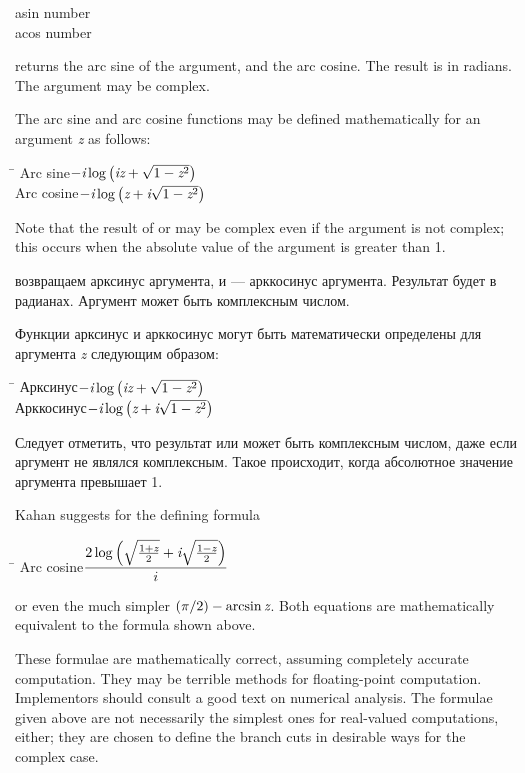 \begin{defun}[Function]
asin number \\
acos number

 returns the arc sine of the argument, and  the arc cosine.
The result is in radians.  The argument may be complex.

The arc sine and arc cosine functions may be defined mathematically for
an argument \emph{z} as follows:
\begin{tabbing}
\hskip 10pc\=\kill
Arc sine\>$ -\emph{i} \log \left(\emph{i}\emph{z} + \sqrt{1-\emph{z}^2}\right) $ \\[2pt]
Arc cosine\>$ -\emph{i} \log \left(\emph{z} + \emph{i}\sqrt{1-\emph{z}^2}\right) $
\end{tabbing}
Note that the result of  or  may be
complex even if the argument is not complex; this occurs
when the absolute value of the argument is greater than 1.

 возвращаем арксинус аргумента, и  --- арккосинус аргумента.
Результат будет в радианах. Аргумент может быть комплексным числом.

Функции арксинус и арккосинус могут быть математически определены для аргумента
\emph{z} следующим образом:
\begin{tabbing}
\hskip 10pc\=\kill
Арксинус\>$ -\emph{i} \log \left(\emph{i}\emph{z} + \sqrt{1-\emph{z}^2}\right) $ \\[2pt]
Арккосинус\>$ -\emph{i} \log \left(\emph{z} + \emph{i}\sqrt{1-\emph{z}^2}\right) $
\end{tabbing}
Следует отметить, что результат  или  может быть комплексным
числом, даже если аргумент не являлся комплексным. Такое происходит, когда
абсолютное значение аргумента превышает 1.

\begin{newer}
Kahan \cite{KAHAN-COMPLEX-FNS} suggests for  the
defining formula
\begin{tabbing}
\hskip 10pc\=\kill
Arc cosine\>$  \displaystyle { 2 \log \left( \sqrt{{1+\emph{z} \over 2}} + \emph{i} \sqrt{{1-\emph{z} \over 2}} \right) \over i}$
\end{tabbing}
or even the much simpler $ (\pi/2)-\arcsin \emph{z} $.  Both equations are mathematically
equivalent to the formula shown above.
\end{newer}

\beforenoterule
\begin{implementation}
These formulae are mathematically correct, assuming
completely accurate computation.  They may be terrible methods for
floating-point computation.  Implementors should consult a good text on
numerical analysis.  The formulae given above are not necessarily
the simplest ones for real-valued computations, either; they are chosen
to define the branch cuts in desirable ways for the complex case.
\end{implementation}
\afternoterule
\end{defun}

